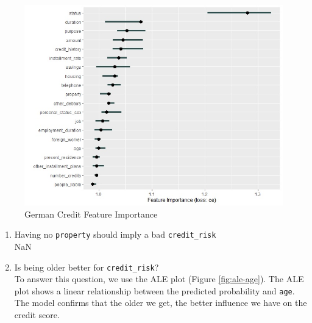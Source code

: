 \documentclass[
]{article}
\newenvironment{Shaded}{\begin{snugshade}}{\end{snugshade}}
\newcommand{\DataTypeTok}[1]{\textcolor[rgb]{0.13,0.29,0.53}{#1}}
\newcommand{\KeywordTok}[1]{\textcolor[rgb]{0.13,0.29,0.53}{\textbf{#1}}}
\newcommand{\NormalTok}[1]{#1}
\newcommand{\OperatorTok}[1]{\textcolor[rgb]{0.81,0.36,0.00}{\textbf{#1}}}
\newcommand{\StringTok}[1]{\textcolor[rgb]{0.31,0.60,0.02}{#1}}
\begin{document}
\begin{figure}

{\centering \includegraphics[width=0.8\linewidth]{plots/feature_importance_ce} 

}

\caption{German Credit Feature Importance}\label{fig:feature-importance}
\end{figure}

\begin{enumerate}
\def\labelenumi{\arabic{enumi}.}
\setcounter{enumi}{1}
\item
  Having no \texttt{property} should imply a bad \texttt{credit\_risk}\\
  NaN
\item
  Is being older better for \texttt{credit\_risk}?\\
  To answer this question, we use the ALE plot (Figure \ref{fig:ale-age}). The ALE plot shows a linear relationship between the predicted probability and \texttt{age}. The model confirms that the older we get, the better influence we have on the credit score.
\end{enumerate}

\begin{Shaded}
\end{Shaded}
\end{document}
